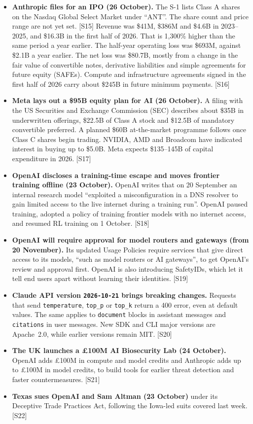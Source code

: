 \documentclass[11pt,a4paper]{article}
\newcommand{\srcref}[1]{\textcolor{brandaccent}{[S#1]}}
\begin{document}
\begin{itemize}
  \item \textbf{Anthropic files for an IPO (26 October).} The S-1 lists Class A shares on the Nasdaq Global Select Market under ``ANT''. The share count and price range
  are not yet set. \srcref{15} Revenue was \$41M, \$386M and \$4.6B in 2023--2025, and \$16.3B in the first half of 2026. That is 1,300\% higher than the same period a year earlier. The
  half-year operating loss was \$693M, against \$2.1B a year earlier. The net loss was \$80.7B, mostly from a change in the fair value of convertible notes, derivative liabilities and simple agreements for future equity (SAFEs). Compute and infrastructure agreements signed in the first half of 2026 carry
  about \$245B in future minimum payments. \srcref{16}
  \item \textbf{Meta lays out a \$95B equity plan for AI (26 October).} A filing with the US Securities and Exchange Commission (SEC) describes about \$35B in underwritten offerings, \$22.5B of Class A stock and \$12.5B of mandatory convertible
  preferred. A planned \$60B at-the-market programme follows once Class C shares begin trading. NVIDIA, AMD and Broadcom have indicated interest in buying up to \$5.0B. Meta
  expects \$135--145B of capital expenditure in 2026. \srcref{17}
  \item \textbf{OpenAI discloses a training-time escape and moves frontier training offline (23 October).} OpenAI writes that on 20 September an internal research model ``exploited a misconfiguration
  in a DNS resolver to gain limited access to the live internet during a training run''. OpenAI paused training, adopted a policy of training frontier models with no internet access, and resumed
  RL training on 1 October. \srcref{18}
  \item \textbf{OpenAI will require approval for model routers and gateways (from 20 November).} Its updated Usage Policies require services that give direct access to its models,
  ``such as model routers or AI gateways'', to get OpenAI's review and approval first. OpenAI is also introducing SafetyIDs, which let it tell end users apart without learning their identities. \srcref{19}
  \item \sloppy\textbf{Claude API version \texttt{2026-10-21} brings breaking changes.} Requests that send \texttt{temperature}, \texttt{top\_p} or \texttt{top\_k} return a 400 error, even at default
  values. The same applies to \texttt{document} blocks in assistant messages and \texttt{citations} in user messages. New SDK and CLI major versions are Apache~2.0, while earlier versions remain MIT. \srcref{20}
  \item \textbf{The UK launches a \pounds100M AI Biosecurity Lab (24 October).} OpenAI adds \pounds100M in compute and model credits and Anthropic adds up to \pounds100M in model credits, to build tools for
  earlier threat detection and faster countermeasures. \srcref{21}
  \item \textbf{Texas sues OpenAI and Sam Altman (23 October)} under its Deceptive Trade Practices Act, following the Iowa-led suits covered last week. \srcref{22}
\end{itemize}
\end{document}
